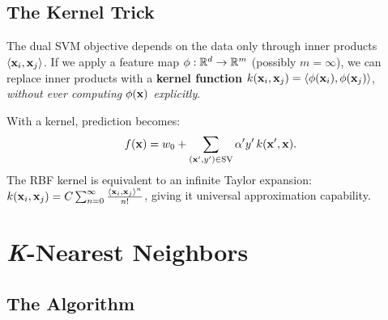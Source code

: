 \documentclass[oneside]{book}
\begin{document}
\section{The Kernel Trick}

The dual SVM objective depends on the data only through inner products $\langle\mathbf{x}_i, \mathbf{x}_j\rangle$. If we apply a feature map $\phi: \mathbb{R}^d \to \mathbb{R}^m$ (possibly $m = \infty$), we can replace inner products with a \textbf{kernel function} $k(\mathbf{x}_i, \mathbf{x}_j) = \langle\phi(\mathbf{x}_i), \phi(\mathbf{x}_j)\rangle$, \emph{without ever computing $\phi(\mathbf{x})$ explicitly}.



With a kernel, prediction becomes:
\[
f(\mathbf{x}) = w_0 + \sum_{(\mathbf{x}',y') \in \mathrm{SV}} \alpha' y'\, k(\mathbf{x}', \mathbf{x}).
\]
The RBF kernel is equivalent to an infinite Taylor expansion: $k(\mathbf{x}_i,\mathbf{x}_j) = C\sum_{n=0}^\infty \frac{\langle\mathbf{x}_i,\mathbf{x}_j\rangle^n}{n!}$, giving it universal approximation capability.

\chapter{\textit{K}-Nearest Neighbors}

\section{The Algorithm}
\end{document}
